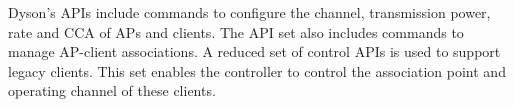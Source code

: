 Dyson's APIs include commands to configure the channel, transmission power, rate and CCA of APs and clients. 
The API set also includes commands to manage AP-client associations.
A reduced set of control APIs is used to support legacy clients. 
This set enables the controller to control the association point and operating channel of these clients. 



%


